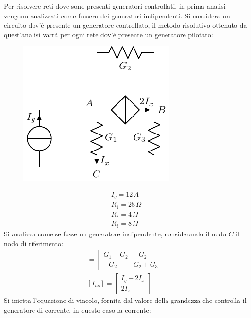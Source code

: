 \documentclass{article}
\numberwithin{equation}{subsection}
\begin{document}
Per risolvere reti dove sono presenti generatori controllati, in prima analisi vengono analizzati come fossero dei generatori indipendenti. 
Si considera un circuito dov'è presente un generatore controllato, il metodo risolutivo ottenuto da quest'analisi varrà per ogni rete dov'è presente un generatore pilotato: 
\begin{figure}[H]%
    \centering
    \includegraphics{circuito-6.pdf}
    \label{fig:circuito-6}
\end{figure}
\begin{gather*}
    I_g=12\,A\\
    R_1=28\,\Omega\\
    R_2=4\,\Omega\\
    R_3=8\,\Omega
\end{gather*}
Si analizza come se fosse un generatore indipendente, considerando il nodo $C$ il nodo di riferimento:
\begin{gather*}
    [G_{no}]=\begin{bmatrix}
        G_1+G_2&-G_2\\
        -G_2&G_2+G_3
    \end{bmatrix}\\
    [I_{no}]=\begin{bmatrix}
        I_g-2I_x\\
        2I_x
    \end{bmatrix}
\end{gather*}
Si inietta l'equazione di vincolo, fornita dal valore della grandezza che controlla il generatore di corrente, in questo caso la corrente: 
\end{document}
